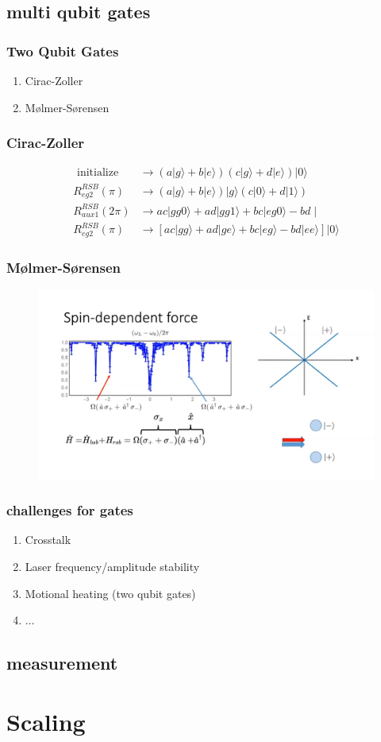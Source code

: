 \documentclass[18 pt]{beamer}
\begin{document}
\subsection{multi qubit gates}
\begin{frame}
  \frametitle{Two Qubit Gates}
  \begin{enumerate}
    \item Cirac-Zoller
    \item Mølmer-Sørensen
  \end{enumerate}
\end{frame}
\begin{frame}
  \frametitle{Cirac-Zoller}
  \begin{align}
    \text { initialize } & \rightarrow(a|g\rangle+b|e\rangle)(c|g\rangle+d|e\rangle)|0\rangle \\
    R_{e g 2}^{R S B}(\pi) & \rightarrow(a|g\rangle+b|e\rangle)|g\rangle(c|0\rangle+d|1\rangle) \\
    R_{a u x 1}^{R S B}(2 \pi) & \rightarrow a c|g g 0\rangle+a d|g g 1\rangle+b c|e g 0\rangle-b d \mid \\
    R_{e g 2}^{R S B}(\pi) & \rightarrow \left[a c|g g\rangle+a d|g e\rangle+b c|e g\rangle-b d|e e\rangle\right]|0\rangle
    \end{align}
\end{frame}
\begin{frame}
  \frametitle{Mølmer-Sørensen}
  \begin{figure}
    \includegraphics[width=.8\textwidth]{M.png}
  \end{figure}
\end{frame}
\begin{frame}
  \frametitle{challenges for gates}
  \begin{enumerate}
    \item Crosstalk
    \item Laser frequency/amplitude stability
    \item Motional heating (two qubit gates)
    \item \(\dots\)
  \end{enumerate}
\end{frame}
\subsection{measurement}
\section{Scaling}
\end{document}
